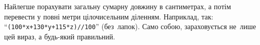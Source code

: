 \Tutorial
Найлегше порахувати загальну сумарну довжину в сантиметрах, а потім перевести у повні метри цілочисельним діленням. Наприклад, так:
``\verb"(100*x+130*y+115*z)//100"'' (без~лапок). Само собою, зараховується не~лише цей вираз, а будь-який правильний.